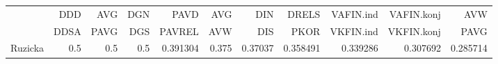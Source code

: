 \begin{tabular}{lrrrrrrrrrr}
\toprule
{} &  DDD &  AVG &  DGN &      PAVD &    AVG &      DIN &     DRELS & VAFIN.ind & VAFIN.konj &       AVW \\
{} & DDSA & PAVG &  DGS &    PAVREL &    AVW &      DIS &      PKOR & VKFIN.ind & VKFIN.konj &      PAVG \\
\midrule
Ruzicka &  0.5 &  0.5 &  0.5 &  0.391304 &  0.375 &  0.37037 &  0.358491 &  0.339286 &   0.307692 &  0.285714 \\
\bottomrule
\end{tabular}
